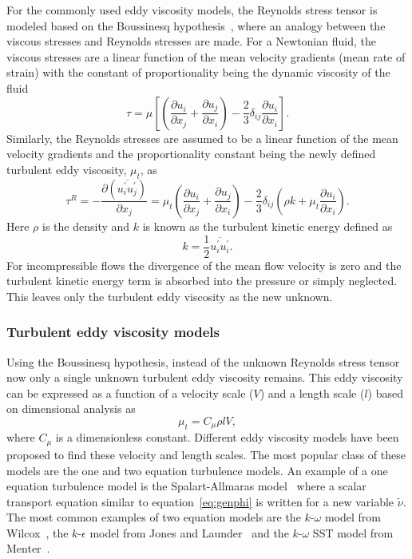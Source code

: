 For the commonly used eddy viscosity models, the Reynolds stress tensor is modeled based on the Boussinesq hypothesis~\cite{Pope2000}, where an analogy between the viscous stresses and Reynolds stresses are made. For a Newtonian fluid, the viscous stresses are a linear function of the mean velocity gradients (mean rate of strain) with the constant of proportionality being the dynamic viscosity of the fluid
\begin{equation}
\tau = \mu \left[\left(\frac{\partial u_i}{\partial x_j} + \frac{\partial u_j}{\partial x_i}\right) - \frac{2}{3}\delta_{ij}\frac{\partial u_i}{\partial x_i}\right].
\end{equation}
Similarly, the Reynolds stresses are assumed to be a linear function of the mean velocity gradients and the proportionality constant being the newly defined turbulent eddy viscosity, $\mu_t$, as
\begin{equation}
\tau^R = - \frac{\partial (\overline{u_i^{\prime}u_j^{\prime}})}{\partial x_j} = \mu_t \left(\frac{\partial u_i}{\partial x_j} + \frac{\partial u_j}{\partial x_i}\right) - \frac{2}{3}\delta_{ij}\left(\rho k + \mu_t\frac{\partial u_i}{\partial x_i}\right).
\end{equation}
Here $\rho$ is the density and $k$ is known as the turbulent kinetic energy defined as
\begin{equation}
k = \frac{1}{2}\overline{u_i^{\prime} u_i^{\prime}}.
\end{equation}
For incompressible flows the divergence of the mean flow velocity is zero and the turbulent kinetic energy term is absorbed into the pressure or simply neglected. This leaves only the turbulent eddy viscosity as the new unknown.

\subsubsection{Turbulent eddy viscosity models}
Using the Boussinesq hypothesis, instead of the unknown Reynolds stress tensor now only a single unknown turbulent eddy viscosity remains. This eddy viscosity can be expressed as a function of a velocity scale ($V$) and a length scale ($l$) based on dimensional analysis as
\begin{equation}
\mu_t = C_{\mu}\rho l V,
\end{equation}
where $C_{\mu}$ is a dimensionless constant. Different eddy viscosity models have been proposed to find these velocity and length scales. The most popular class of these models are the one and two equation turbulence models. An example of a one equation turbulence model is the Spalart-Allmaras model~\cite{spalart1992one} where a scalar transport equation similar to equation~\ref{eq:genphi} is written for a new variable $\tilde{\nu}$. The most common examples of two equation models are the $k$-$\omega$ model from Wilcox~\cite{wilcox1988komega,wilcox2008komega}, the $k$-$\epsilon$ model from Jones and Launder~\cite{launder1974kepsilon,jones1972kepsilon} and the $k$-$\omega$ SST model from Menter~\cite{menter1994two}.

